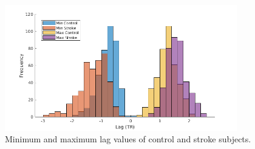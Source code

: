 \documentclass[fleqn,10pt]{wlscirep}
\begin{document}
\begin{figure}[]
\centering
\includegraphics[width=0.9\textwidth]{figures/lag_minmax.png}
\renewcommand{\figurename}{Supplementary Figure}
\caption{\label{fig:lag_minmax} Minimum and maximum lag values of control and stroke subjects.} 
\end{figure}
\end{document}
